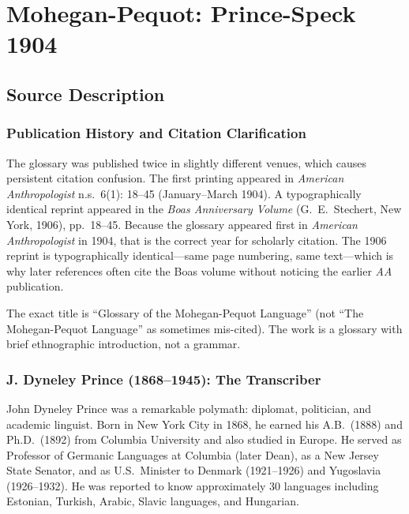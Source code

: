 
\section{Mohegan-Pequot: Prince-Speck 1904}
\label{sec:1368}

\subsection{Source Description}

\subsubsection{Publication History and Citation Clarification}

The glossary was published twice in slightly different venues, which causes
persistent citation confusion. The first printing appeared in \emph{American
Anthropologist} n.s.\ 6(1): 18--45 (January--March 1904). A typographically
identical reprint appeared in the \emph{Boas Anniversary Volume} (G.\ E.\
Stechert, New York, 1906), pp.\ 18--45. Because the glossary appeared first
in \emph{American Anthropologist} in 1904, that is the correct year for
scholarly citation. The 1906 reprint is typographically identical---same page
numbering, same text---which is why later references often cite the Boas
volume without noticing the earlier \emph{AA} publication.

The exact title is ``Glossary of the Mohegan-Pequot Language'' (not ``The
Mohegan-Pequot Language'' as sometimes mis-cited). The work is a glossary
with brief ethnographic introduction, not a grammar.

\subsubsection{J. Dyneley Prince (1868--1945): The Transcriber}

John Dyneley Prince was a remarkable polymath: diplomat, politician, and
academic linguist. Born in New York City in 1868, he earned his A.B.\ (1888)
and Ph.D.\ (1892) from Columbia University and also studied in Europe. He
served as Professor of Germanic Languages at Columbia (later Dean), as a New
Jersey State Senator, and as U.S.\ Minister to Denmark (1921--1926) and
Yugoslavia (1926--1932). He was reported to know approximately 30 languages
including Estonian, Turkish, Arabic, Slavic languages, and Hungarian.


